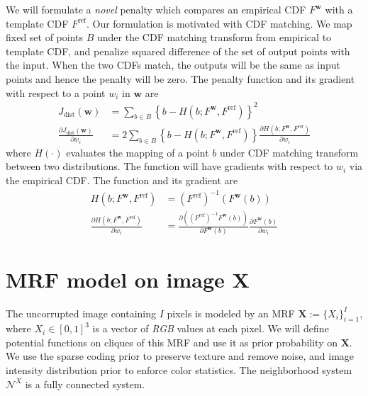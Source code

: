 We will formulate a \emph{novel} penalty which compares an empirical CDF $F^\mathbf{w}$ with a template CDF $F^\text{ref}$. Our formulation is motivated with CDF matching. We map fixed set of points $B$ under the CDF matching transform from empirical to template CDF, and penalize squared difference of the set of output points with the input. When the two CDFs match, the outputs will be the same as input points and hence the penalty will be zero. The penalty function and its gradient with respect to a point $w_i$ in $\mathbf{w}$ are
\begin{align}
    J_\text{dist} (\mathbf{w}) &= \sum_{b \in B} \left\lbrace b - H \left( b; F^\mathbf{w}, F^\text{ref} \right) \right\rbrace^2 \label{eqn:kdecost} \\
    \frac{ \partial J_\text{dist} (\mathbf{w})} { \partial w_i} &= 2 \sum_{b \in B} \left\lbrace b - H \left( b; F^\mathbf{w}, F^\text{ref} \right) \right\rbrace \frac{\partial H \left( b; F^\mathbf{w}, F^\text{ref} \right)}{\partial w_i}
\end{align}
where $H \left( \cdot \right)$ evaluates the mapping of a point $b$ under CDF matching transform between two distributions. The function will have gradients with respect to $w_i$ via the empirical CDF. The function and its gradient are
\begin{align}
    H \left( b; F^\mathbf{w}, F^\text{ref} \right) &= \left( F^\text{ref}\right)^{-1} \left( F^\mathbf{w} \left(b \right) \right) \label{eqn:cdfinv} \\
    \frac{\partial H \left( b; F^\mathbf{w}, F^\text{ref} \right)}{\partial w_i} &= \frac{ \partial \left( \left( F^\text{ref}\right)^{-1} F^\mathbf{w} \left(b\right) \right) } { \partial F^\mathbf{w} \left( b \right) } \frac{ \partial F^\mathbf{w} \left( b \right)} { \partial w_i}
\end{align}

\section{MRF model on image $\mathbf{X}$}
\label{sec:modelX}

The uncorrupted image containing $I$ pixels is modeled by an MRF $\mathbf{X} := \lbrace X_i \rbrace_{i=1}^{I}$, where $X_i \in \left[0, 1\right]^3$ is a vector of \emph{RGB} values at each pixel. We will define potential functions on cliques of this MRF and use it as prior probability on $\mathbf{X}$. We use the sparse coding prior to preserve texture and remove noise, and image intensity distribution prior to enforce color statistics. The neighborhood system $\mathcal{N}^X$ is a fully connected system.

